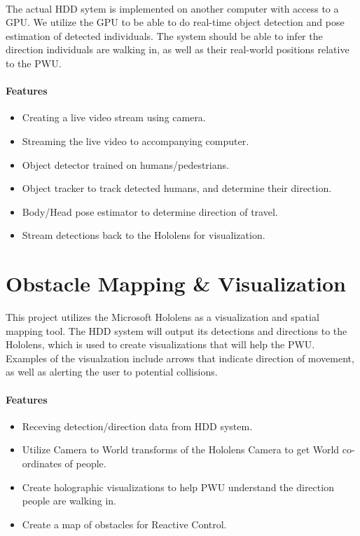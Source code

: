 \paragraph{}The actual HDD sytem is implemented on another computer with access to a GPU. We utilize the GPU to be able to do real-time object detection and pose estimation of detected individuals. The system should be able to infer the direction individuals are walking in, as well as their real-world positions relative to the PWU.

\paragraph{Features} 
\begin{itemize}
	\item Creating a live video stream using camera.
	\item Streaming the live video to accompanying computer.
	\item Object detector trained on humans/pedestrians.
	\item Object tracker to track detected humans, and determine their direction.
	\item Body/Head pose estimator to determine direction of travel.
	\item Stream detections back to the Hololens for visualization.
\end{itemize}

\section{Obstacle Mapping \& Visualization }
This project utilizes the Microsoft Hololens as a visualization and spatial mapping tool. The HDD system will output its detections and directions to the Hololens, which is used to create visualizations that will help the PWU. Examples of the visualzation include arrows that indicate direction of movement, as well as alerting the user to potential collisions.

\paragraph{Features}
\begin{itemize}
	\item Receving detection/direction data from HDD system.
	\item Utilize Camera to World transforms of the Hololens Camera to get World co-ordinates of people.
	\item Create holographic visualizations to help PWU understand the direction people are walking in.
	\item Create a map of obstacles for Reactive Control.
\end{itemize}
 

